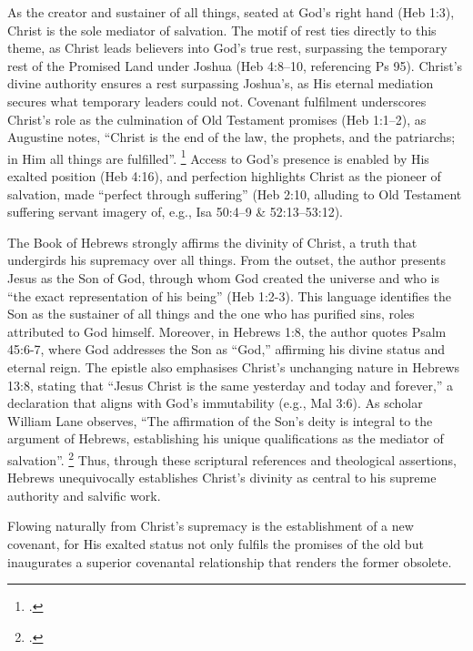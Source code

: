 \documentclass[12pt]{article}
\begin{document}
As the creator and sustainer of all things, seated at God’s right hand (Heb
1:3), Christ is the sole mediator of salvation.
The motif of rest ties directly to this theme, as Christ leads believers into
God’s true rest, surpassing the temporary rest of the Promised Land under Joshua
(Heb 4:8--10, referencing Ps 95).
Christ’s divine authority ensures a rest surpassing Joshua’s, as His eternal
mediation secures what temporary leaders could not.
Covenant fulfilment underscores Christ’s role as the culmination of Old
Testament promises (Heb 1:1--2), as Augustine notes, ``Christ is the end of the
law, the prophets, and the patriarchs; in Him all things are fulfilled''.
\footcite[14.24]{Augustine1887}
Access to God’s presence is enabled by His exalted position (Heb 4:16), and
perfection highlights Christ as the pioneer of salvation, made ``perfect through
suffering'' (Heb 2:10, alluding to Old Testament suffering servant imagery of,
e.g., Isa 50:4--9 \& 52:13--53:12).

The Book of Hebrews strongly affirms the divinity of Christ, a truth that
undergirds his supremacy over all things. From the outset, the author presents
Jesus as the Son of God, through whom God created the universe and who is ``the
exact representation of his being'' (Heb 1:2-3). This language identifies the
Son as the sustainer of all things and the one who has purified sins, roles
attributed to God himself. Moreover, in Hebrews 1:8, the author quotes Psalm
45:6-7, where God addresses the Son as ``God,'' affirming his divine status and
eternal reign. The epistle also emphasises Christ’s unchanging nature in Hebrews
13:8, stating that ``Jesus Christ is the same yesterday and today and forever,''
a declaration that aligns with God’s immutability (e.g., Mal 3:6). As scholar
William Lane observes, ``The affirmation of the Son’s deity is integral to the
argument of Hebrews, establishing his unique qualifications as the mediator of
salvation''. \footcite[15]{Lane1991}
Thus, through these scriptural references and theological assertions, Hebrews
unequivocally establishes Christ’s divinity as central to his supreme authority
and salvific work.

Flowing naturally from Christ’s supremacy is the establishment of a new
covenant, for His exalted status not only fulfils the promises of the old but
inaugurates a superior covenantal relationship that renders the former obsolete.
\end{document}
